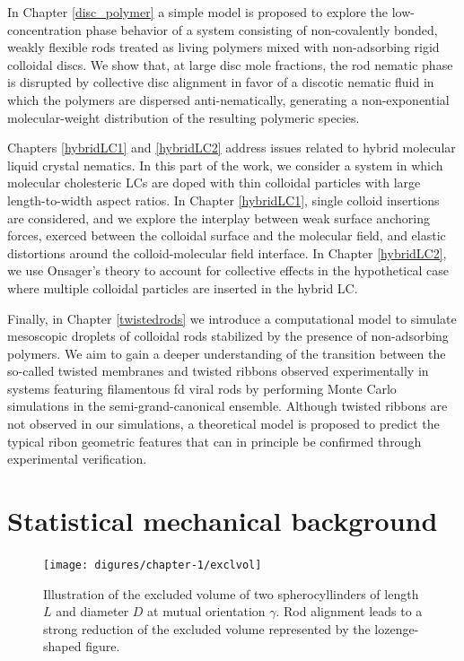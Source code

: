 In Chapter \ref{disc_polymer} a simple model is proposed to explore the low-concentration phase behavior of a system consisting of non-covalently bonded, weakly flexible rods treated as living polymers mixed with non-adsorbing rigid colloidal discs. We show that, at large disc mole fractions, the rod nematic phase is disrupted by collective disc alignment in favor of a discotic nematic fluid in which the polymers are dispersed anti-nematically, generating a non-exponential molecular-weight distribution of the resulting polymeric species.

Chapters \ref{hybridLC1} and \ref{hybridLC2} address issues related to hybrid molecular liquid crystal nematics. In this part of the work, we consider a system in which molecular cholesteric LCs are doped with thin colloidal particles with large length-to-width aspect ratios. In Chapter \ref{hybridLC1}, single colloid insertions are considered, and we explore the interplay between weak surface anchoring forces, exerced between the colloidal surface and the molecular field, and elastic distortions around the colloid-molecular field interface. In Chapter \ref{hybridLC2}, we use Onsager's theory to account for collective effects in the hypothetical case where multiple colloidal particles are inserted in the hybrid LC.

Finally, in Chapter  \ref{twistedrods} we introduce a computational model to simulate mesoscopic droplets of colloidal rods stabilized by the presence of non-adsorbing polymers. We aim to gain a deeper understanding of the transition between the so-called twisted membranes and twisted ribbons observed experimentally in systems featuring filamentous fd viral rods \cite{Gibaud2012} by performing Monte Carlo simulations in the semi-grand-canonical ensemble. Although twisted ribbons are not observed in our simulations, a theoretical model is proposed to predict the typical ribon geometric features that can in principle be confirmed through experimental verification.


\section{Statistical mechanical background}

\begin{figure}
\begin{center}
\texttt{[image: digures/chapter-1/exclvol]}
\caption{ \label{introfig3} Illustration of the excluded volume of two spherocyllinders  of length $L$ and diameter $D$ at mutual orientation $\gamma$. Rod alignment leads to a strong reduction of the excluded volume represented by the lozenge-shaped figure.}
\end{center}
\end{figure}

